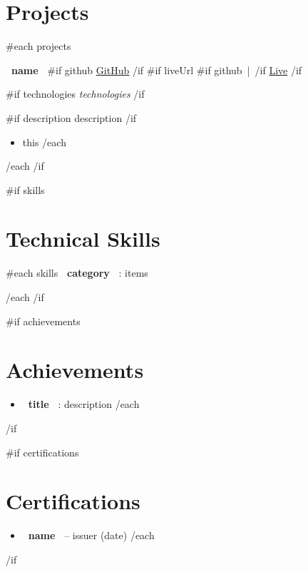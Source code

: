 \documentclass[10pt,a4paper]{article}
\begin{document}
\section{Projects}

{{#each projects}}

\noindent
\textbf{ {{~name~}} }
\hfill
{{#if github}}
\href{ {{~github~}} }{GitHub}
{{/if}}
{{#if liveUrl}}
{{#if github}} \,|\, {{/if}}
\href{ {{~liveUrl~}} }{Live}
{{/if}}

{{#if technologies}}
\textit{ {{technologies}} }
{{/if}}

{{#if description}}
{{description}}
{{/if}}

\begin{itemize}
{{#each bullets}}
    \item {{this}}
{{/each}}
\end{itemize}

{{/each}}
{{/if}}


{{#if skills}}
\section{Technical Skills}

{{#each skills}}
\textbf{ {{~category~}} }: {{items}}

{{/each}}
{{/if}}


{{#if achievements}}
\section{Achievements}

\begin{itemize}
{{#each achievements}}
    \item \textbf{ {{~title~}} }: {{description}}
{{/each}}
\end{itemize}

{{/if}}


{{#if certifications}}
\section{Certifications}

\begin{itemize}
{{#each certifications}}
    \item \textbf{ {{~name~}} } -- {{issuer}} ({{date}})
{{/each}}
\end{itemize}

{{/if}}
\end{document}

